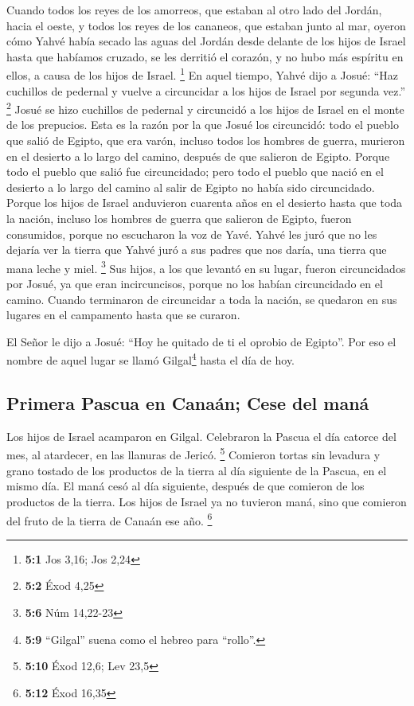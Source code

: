 \begin{paracol}{2}
 Cuando todos los reyes de los amorreos, que estaban al
otro lado del Jordán, hacia el oeste, y todos los reyes de los cananeos,
que estaban junto al mar, oyeron cómo Yahvé había secado las aguas del
Jordán desde delante de los hijos de Israel hasta que habíamos cruzado,
se les derritió el corazón, y no hubo más espíritu en ellos, a causa de
los hijos de Israel. \footnote{\textbf{5:1} Jos 3,16; Jos 2,24}
 En aquel tiempo, Yahvé dijo a Josué: ``Haz cuchillos de
pedernal y vuelve a circuncidar a los hijos de Israel por segunda vez.''
\footnote{\textbf{5:2} Éxod 4,25}  Josué se hizo cuchillos
de pedernal y circuncidó a los hijos de Israel en el monte de los
prepucios.  Esta es la razón por la que Josué los
circuncidó: todo el pueblo que salió de Egipto, que era varón, incluso
todos los hombres de guerra, murieron en el desierto a lo largo del
camino, después de que salieron de Egipto.  Porque todo el
pueblo que salió fue circuncidado; pero todo el pueblo que nació en el
desierto a lo largo del camino al salir de Egipto no había sido
circuncidado.  Porque los hijos de Israel anduvieron
cuarenta años en el desierto hasta que toda la nación, incluso los
hombres de guerra que salieron de Egipto, fueron consumidos, porque no
escucharon la voz de Yavé. Yahvé les juró que no les dejaría ver la
tierra que Yahvé juró a sus padres que nos daría, una tierra que mana
leche y miel. \footnote{\textbf{5:6} Núm 14,22-23}  Sus
hijos, a los que levantó en su lugar, fueron circuncidados por Josué, ya
que eran incircuncisos, porque no los habían circuncidado en el camino.
 Cuando terminaron de circuncidar a toda la nación, se
quedaron en sus lugares en el campamento hasta que se curaron.

 El Señor le dijo a Josué: ``Hoy he quitado de ti el
oprobio de Egipto''. Por eso el nombre de aquel lugar se llamó
Gilgal\footnote{\textbf{5:9} ``Gilgal'' suena como el hebreo para
  ``rollo''.} hasta el día de hoy.

\hypertarget{primera-pascua-en-canauxe1n-cese-del-manuxe1}{%
\subsection{Primera Pascua en Canaán; Cese del
maná}\label{primera-pascua-en-canauxe1n-cese-del-manuxe1}}

 Los hijos de Israel acamparon en Gilgal. Celebraron la
Pascua el día catorce del mes, al atardecer, en las llanuras de Jericó.
\footnote{\textbf{5:10} Éxod 12,6; Lev 23,5}  Comieron
tortas sin levadura y grano tostado de los productos de la tierra al día
siguiente de la Pascua, en el mismo día.  El maná cesó al
día siguiente, después de que comieron de los productos de la tierra.
Los hijos de Israel ya no tuvieron maná, sino que comieron del fruto de
la tierra de Canaán ese año. \footnote{\textbf{5:12} Éxod 16,35}


\end{paracol}

